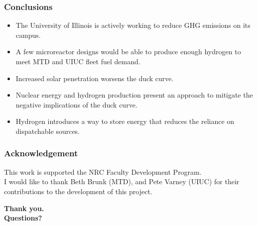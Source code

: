\begin{frame}
\frametitle{Conclusions}

\begin{itemize}
	\item The University of Illinois is actively working to reduce GHG emissions on its campus. 
	\item A few microreactor designs would be able to produce enough hydrogen to meet MTD and UIUC fleet fuel demand.
	\item Increased solar penetration worsens the duck curve.
	\item Nuclear energy and hydrogen production present an approach to mitigate the negative implications of the duck curve.
	\item Hydrogen introduces a way to store energy that reduces the reliance on dispatchable sources.

\end{itemize}
\end{frame}


\begin{frame}
\frametitle{Acknowledgement}

This work is supported the NRC Faculty Development Program.
\\
I would like to thank Beth Brunk (MTD), and Pete Varney (UIUC) for their contributions to the development of this project.

\end{frame}


\begin{frame}
  \begin{center}
    \Huge{\textbf{Thank you.\\ Questions?}}
  \end{center}
\end{frame}
